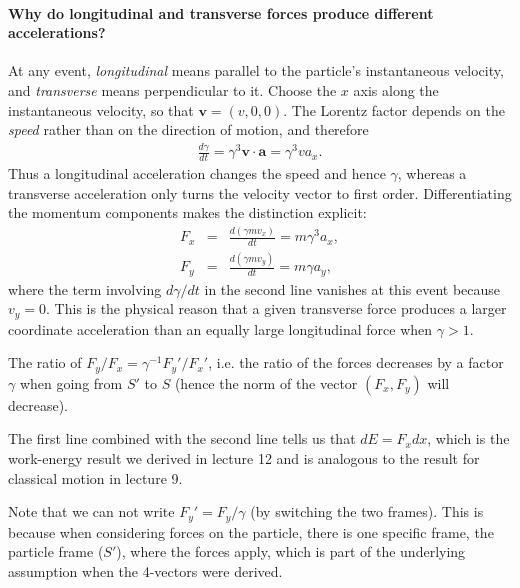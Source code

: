 \documentclass[12pt]{article}
\newcommand{\be}{\begin{eqnarray}}
\newcommand{\ee}{\end{eqnarray}}
\begin{document}
\paragraph{Why do longitudinal and transverse forces produce different accelerations?}
At any event, \emph{longitudinal} means parallel to the particle's instantaneous velocity, and \emph{transverse} means perpendicular to it. Choose the $x$ axis along the instantaneous velocity, so that $\mathbf v=(v,0,0)$. The Lorentz factor depends on the \emph{speed} rather than on the direction of motion, and therefore
\be
\frac{d\gamma}{dt}=\gamma^3\mathbf v\cdot\mathbf a=\gamma^3va_x.
\ee
Thus a longitudinal acceleration changes the speed and hence $\gamma$, whereas a transverse acceleration only turns the velocity vector to first order. Differentiating the momentum components makes the distinction explicit:
\be
F_x&=&\frac{d(\gamma mv_x)}{dt}
=m\gamma^3a_x,\nonumber\\
F_y&=&\frac{d(\gamma mv_y)}{dt}
=m\gamma a_y,\label{eq:force-components-explained}
\ee
where the term involving $d\gamma/dt$ in the second line vanishes at this event because $v_y=0$. This is the physical reason that a given transverse force produces a larger coordinate acceleration than an equally large longitudinal force when $\gamma>1$.

The ratio of $F_y/F_x = \gamma^{-1}F_y'/F_x'$, i.e. the ratio of the forces decreases by a factor $\gamma$ when going from $S'$ to $S$ (hence the norm of the vector $(F_x, F_y)$ will decrease). 

The first line combined with the second line tells us that $dE = F_x dx$, which is the work-energy result we derived in lecture 12 and is analogous to the result for classical motion in lecture 9. 

Note that we can not write $F_y' = F_y/\gamma$ (by switching the two frames). This is because when considering forces on the particle, there is one specific frame, the particle frame ($S'$), where the forces apply, which is part of the underlying assumption when the 4-vectors were derived.  
\end{document}
